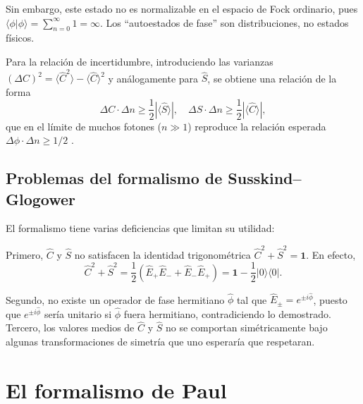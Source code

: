             Sin embargo, este estado no es normalizable en el espacio de Fock ordinario, pues $\langle\phi|\phi\rangle = \sum_{n=0}^{\infty}1 = \infty$. Los ``autoestados de fase'' son distribuciones, no estados físicos.
            
            Para la relación de incertidumbre, introduciendo las varianzas $(\Delta C)^2 = \langle \hat{C}^2\rangle - \langle\hat{C}\rangle^2$ y análogamente para $\hat{S}$, se obtiene una relación de la forma
            \begin{equation}
                \Delta C \cdot \Delta n \geq \frac{1}{2}|\langle\hat{S}\rangle|, \quad \Delta S \cdot \Delta n \geq \frac{1}{2}|\langle\hat{C}\rangle|,
            \end{equation}
            que en el límite de muchos fotones ($n \gg 1$) reproduce la relación esperada $\Delta\phi \cdot \Delta n \geq 1/2$ \cite{Carruthers1968}.
        
                \subsection{Problemas del formalismo de Susskind--Glogower}
                
                    El formalismo tiene varias deficiencias que limitan su utilidad:
                    
                    Primero, $\hat{C}$ y $\hat{S}$ no satisfacen la identidad trigonométrica $\hat{C}^2 + \hat{S}^2 = \mathbf{1}$. En efecto,
                    \begin{equation}
                        \hat{C}^2 + \hat{S}^2 = \frac{1}{2}(\hat{E}_{+}\hat{E}_{-} + \hat{E}_{-}\hat{E}_{+}) = \mathbf{1} - \frac{1}{2}|0\rangle\langle 0|.
                        \label{eq:SG_identidad_rota}
                    \end{equation}
                    
                    Segundo, no existe un operador de fase hermitiano $\hat{\phi}$ tal que $\hat{E}_{\pm} = e^{\pm i\hat{\phi}}$, puesto que $e^{\pm i\hat{\phi}}$ sería unitario si $\hat{\phi}$ fuera hermitiano, contradiciendo lo demostrado. Tercero, los valores medios de $\hat{C}$ y $\hat{S}$ no se comportan simétricamente bajo algunas transformaciones de simetría que uno esperaría que respetaran.
 
    \section{El formalismo de Paul}
    
